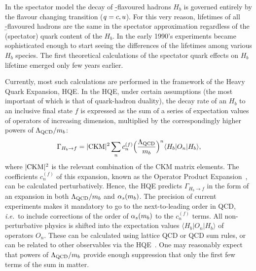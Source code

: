 %
%


In the spectator model the decay of \b-flavoured hadrons $H_b$ is
governed entirely by the flavour changing  transition
($q=c,u$).  For this very reason, lifetimes of all
\b-flavoured hadrons are the same in the spectator approximation
regardless of the (spectator) quark content of the $H_b$.  In the early
1990's experiments became sophisticated enough to start seeing the
differences of the lifetimes among various $H_b$ species.  The first
theoretical calculations of the spectator quark effects on $H_b$
lifetime emerged only few years earlier.

Currently, most such calculations are performed in the framework of
the Heavy Quark Expansion, HQE.  In the HQE, under certain assumptions
(the most important of which is that of quark-hadron duality), the decay
rate of an $H_b$ to an inclusive final state $f$ is expressed as the sum
of a series of expectation values of operators of increasing dimension,
multiplied by the correspondingly higher powers of $\Lambda_{\rm
QCD}/m_b$:
\begin{equation}
\Gamma_{H_b\to f} = |{\rm CKM}|^2\sum_n c_n^{(f)}
\Bigl(\frac{\Lambda_{\rm QCD}}{m_b}\Bigr)^n\langle H_b|O_n|H_b\rangle,
\labe{hqe}
\end{equation}
where $|{\rm CKM}|^2$ is the relevant combination of the CKM matrix elements.
The coefficients $c_n^{(f)}$ of this expansion, known as the Operator Product
Expansion~\cite{Shifman:1986mx,*Chay:1990da,*Bigi:1992su,*Bigi:1992su_erratum},
can be calculated perturbatively.  Hence, the HQE
predicts $\Gamma_{H_b\to f}$ in the form of an expansion in both
$\Lambda_{\rm QCD}/m_{b}$ and $\alpha_s(m_{b})$.  The precision of
current experiments makes it mandatory to go to the next-to-leading
order in QCD, {\em i.e.}\ to include corrections of the order of
$\alpha_s(m_{b})$ to the $c_n^{(f)}$ terms.  All non-perturbative physics
is shifted into the expectation values $\langle H_b|O_n|H_b\rangle$ of
operators $O_n$.  These can be calculated using lattice QCD or QCD sum
rules, or can be related to other observables via the
HQE~\cite{Bigi:1995jr,*Bellini:1996ra}.  One may reasonably expect that powers of
$\Lambda_{\rm QCD}/m_{b}$ provide enough suppression that only the
first few terms of the sum in  matter.

